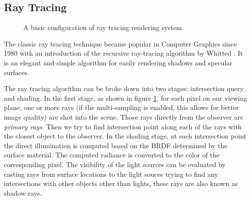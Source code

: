 \subsection{Ray Tracing}
\label{sec:mc_rt}

\begin{figure}[ht]
    \centering
    \renewcommand{\thefigure}{\thechapter.\arabic{figure}}
    \caption[Ray Tracing System Configuration]{A basic configuration of ray tracing rendering system.}
    \label{fig:ray_tracing}
\end{figure}

The classic ray tracing technique became popular in Computer Graphics since 1980 with an introduction of the recursive ray-tracing algorithm by Whitted \cite{Whitted1980}. It is an elegant and simple algorithm for easily rendering shadows and specular surfaces.

The ray tracing algorithm can be broke down into two stages: intersection query and shading. In the first stage, as shown in figure \ref{fig:ray_tracing}, for each pixel on our viewing plane, one or more rays (if the multi-sampling is enabled, this allows for better image quality) are shot into the scene. Those rays directly from the observer are \emph{primary rays}. Then we try to find intersection point along each of the rays with the closest object to the observer. In the shading stage, at each intersection point the direct illumination is computed based on the BRDF determined by the surface material. The computed radiance is converted to the color of the corresponding pixel. The visibility of the light sources can be evaluated by casting rays from surface locations to the light souces trying to find any intersections with other objects other than lights, these rays are also known as shadow rays.

